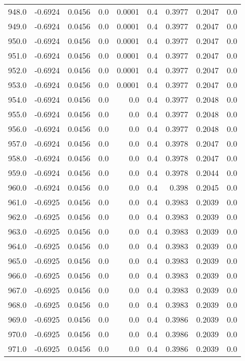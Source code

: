 \begin{longtable}{lrrrrrrrr}
948.0 & -0.6924 & 0.0456 & 0.0 & 0.0001 & 0.4 & 0.3977 & 0.2047 & 0.0 \\
949.0 & -0.6924 & 0.0456 & 0.0 & 0.0001 & 0.4 & 0.3977 & 0.2047 & 0.0 \\
950.0 & -0.6924 & 0.0456 & 0.0 & 0.0001 & 0.4 & 0.3977 & 0.2047 & 0.0 \\
951.0 & -0.6924 & 0.0456 & 0.0 & 0.0001 & 0.4 & 0.3977 & 0.2047 & 0.0 \\
952.0 & -0.6924 & 0.0456 & 0.0 & 0.0001 & 0.4 & 0.3977 & 0.2047 & 0.0 \\
953.0 & -0.6924 & 0.0456 & 0.0 & 0.0001 & 0.4 & 0.3977 & 0.2047 & 0.0 \\
954.0 & -0.6924 & 0.0456 & 0.0 & 0.0 & 0.4 & 0.3977 & 0.2048 & 0.0 \\
955.0 & -0.6924 & 0.0456 & 0.0 & 0.0 & 0.4 & 0.3977 & 0.2048 & 0.0 \\
956.0 & -0.6924 & 0.0456 & 0.0 & 0.0 & 0.4 & 0.3977 & 0.2048 & 0.0 \\
957.0 & -0.6924 & 0.0456 & 0.0 & 0.0 & 0.4 & 0.3978 & 0.2047 & 0.0 \\
958.0 & -0.6924 & 0.0456 & 0.0 & 0.0 & 0.4 & 0.3978 & 0.2047 & 0.0 \\
959.0 & -0.6924 & 0.0456 & 0.0 & 0.0 & 0.4 & 0.3978 & 0.2044 & 0.0 \\
960.0 & -0.6924 & 0.0456 & 0.0 & 0.0 & 0.4 & 0.398 & 0.2045 & 0.0 \\
961.0 & -0.6925 & 0.0456 & 0.0 & 0.0 & 0.4 & 0.3983 & 0.2039 & 0.0 \\
962.0 & -0.6925 & 0.0456 & 0.0 & 0.0 & 0.4 & 0.3983 & 0.2039 & 0.0 \\
963.0 & -0.6925 & 0.0456 & 0.0 & 0.0 & 0.4 & 0.3983 & 0.2039 & 0.0 \\
964.0 & -0.6925 & 0.0456 & 0.0 & 0.0 & 0.4 & 0.3983 & 0.2039 & 0.0 \\
965.0 & -0.6925 & 0.0456 & 0.0 & 0.0 & 0.4 & 0.3983 & 0.2039 & 0.0 \\
966.0 & -0.6925 & 0.0456 & 0.0 & 0.0 & 0.4 & 0.3983 & 0.2039 & 0.0 \\
967.0 & -0.6925 & 0.0456 & 0.0 & 0.0 & 0.4 & 0.3983 & 0.2039 & 0.0 \\
968.0 & -0.6925 & 0.0456 & 0.0 & 0.0 & 0.4 & 0.3983 & 0.2039 & 0.0 \\
969.0 & -0.6925 & 0.0456 & 0.0 & 0.0 & 0.4 & 0.3986 & 0.2039 & 0.0 \\
970.0 & -0.6925 & 0.0456 & 0.0 & 0.0 & 0.4 & 0.3986 & 0.2039 & 0.0 \\
971.0 & -0.6925 & 0.0456 & 0.0 & 0.0 & 0.4 & 0.3986 & 0.2039 & 0.0 \\

\end{longtable}
